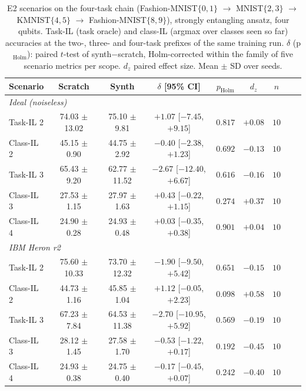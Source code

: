 \begin{table}[ht]
\centering
\small
\setlength{\tabcolsep}{4pt}
\caption{E2 scenarios on the four-task chain (Fashion-MNIST$\{0,1\}$ $\to$ MNIST$\{2,3\}$ $\to$ KMNIST$\{4,5\}$ $\to$ Fashion-MNIST$\{8,9\}$), strongly entangling ansatz, four qubits. Task-IL (task oracle) and class-IL (argmax over classes seen so far) accuracies at the two-, three- and four-task prefixes of the same training run. $\delta$ (p$_{\text{Holm}}$): paired $t$-test of synth$-$scratch, Holm-corrected within the family of five scenario metrics per scope. $d_z$ paired effect size. Mean $\pm$ SD over seeds.}
\label{tab:e234_chain4}
\begin{tabular}{lcccccccc}
\toprule
Scenario & Scratch & Synth & $\delta$ [95\% CI] & $p_{\text{Holm}}$ & $d_z$ & $n$ \\
\midrule
\multicolumn{7}{l}{\textit{Ideal (noiseless)}} \\
Task-IL 2 & 74.03 $\pm$ 13.02 & 75.10 $\pm$ 9.81 & $+1.07$ [$-7.45$, $+9.15$] & $0.817$ & $+0.08$ & $10$ \\
Class-IL 2 & 45.15 $\pm$ 0.90 & 44.75 $\pm$ 2.92 & $-0.40$ [$-2.38$, $+1.23$] & $0.692$ & $-0.13$ & $10$ \\
Task-IL 3 & 65.43 $\pm$ 9.20 & 62.77 $\pm$ 11.52 & $-2.67$ [$-12.40$, $+6.67$] & $0.616$ & $-0.16$ & $10$ \\
Class-IL 3 & 27.53 $\pm$ 1.15 & 27.97 $\pm$ 1.63 & $+0.43$ [$-0.22$, $+1.15$] & $0.274$ & $+0.37$ & $10$ \\
Class-IL 4 & 24.90 $\pm$ 0.28 & 24.93 $\pm$ 0.48 & $+0.03$ [$-0.35$, $+0.38$] & $0.901$ & $+0.04$ & $10$ \\
\midrule
\multicolumn{7}{l}{\textit{IBM Heron r2}} \\
Task-IL 2 & 75.60 $\pm$ 10.33 & 73.70 $\pm$ 12.32 & $-1.90$ [$-9.50$, $+5.42$] & $0.651$ & $-0.15$ & $10$ \\
Class-IL 2 & 44.73 $\pm$ 1.16 & 45.85 $\pm$ 1.04 & $+1.12$ [$-0.05$, $+2.23$] & $0.098$ & $+0.58$ & $10$ \\
Task-IL 3 & 67.23 $\pm$ 7.84 & 64.53 $\pm$ 11.38 & $-2.70$ [$-10.95$, $+5.92$] & $0.569$ & $-0.19$ & $10$ \\
Class-IL 3 & 28.12 $\pm$ 1.45 & 27.58 $\pm$ 1.70 & $-0.53$ [$-1.22$, $+0.17$] & $0.192$ & $-0.45$ & $10$ \\
Class-IL 4 & 24.93 $\pm$ 0.38 & 24.75 $\pm$ 0.40 & $-0.17$ [$-0.45$, $+0.07$] & $0.242$ & $-0.40$ & $10$ \\

\end{tabular}
\end{table}

